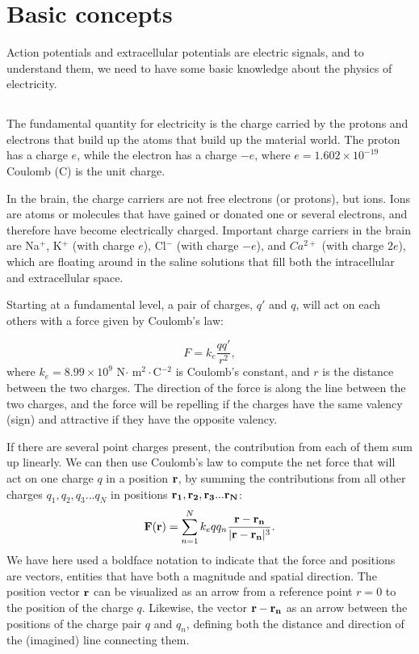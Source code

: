 \section{Basic concepts} 
\label{sec:Basics}
Action potentials and extracellular potentials are electric signals, and to understand them, we need to have some basic knowledge about the physics of electricity. 


\subsection{}
The fundamental quantity for electricity is the charge carried by the protons and electrons that build up the atoms that build up the material world. The proton has a charge $e$, while the electron has a charge $-e$, where $e = 1.602\times10^{-19}$ Coulomb (C) is the unit charge. 

In the brain, the charge carriers are not free electrons (or protons), but ions. Ions are atoms or molecules that have gained or donated one or several electrons, and therefore have become electrically charged. Important charge carriers in the brain are Na$^+$, K$^+$ (with charge $e$), Cl$^-$ (with charge $-e$), and $Ca^{2+}$ (with charge $2e$), which are floating around in the saline solutions that fill both the intracellular and extracellular space.

Starting at a fundamental level, a pair of charges, $q'$ and $q$, will act on each others with a force given by Coulomb's law:

\begin{equation}
F = k_e\frac{q q'}{r^2}, 
\label{Basics:eq:CoulombF}
\end{equation}
where $k_e = 8.99\times10^9$ N$\cdot$ m$^2\cdot$C$^{-2}$ is Coulomb's constant, and $r$ is the distance between the two charges. The direction of the force is along the line between the two charges, and the force will be repelling if the charges have the same valency (sign) and attractive if they have the opposite valency. 

If there are several point charges present, the contribution from each of them sum up linearly. We can then use Coulomb's law to compute the net force that will act on one charge $q$ in a position ${\bf r}$, by summing the contributions from all other charges $q_1, q_2, q_3 ... q_N$ in positions ${\bf r_1}, {\bf r_2}, {\bf r_3} ... {\bf r_N}$: 
\begin{equation}
{\bf F}({\bf r}) = \sum_{n=1}^N k_e q q_n \frac{{\bf r}-{\bf r_n}}{|{\bf r}-{\bf r_n}|^3}.
\label{Basics:eq:CoulombFN}
\end{equation}
We have here used a boldface notation to indicate that the force and positions are vectors, entities that have both a magnitude and spatial direction. The position vector ${\bf r}$ can be visualized as an arrow from a reference point $r=0$ to the position of the charge $q$. Likewise, the vector ${\bf r}-{\bf r_n}$ as an arrow between the positions of the charge pair $q$ and $q_n$, defining both the distance and direction of the (imagined) line connecting them.

